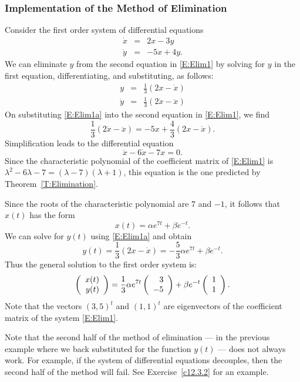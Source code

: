 \documentclass{ximera}
\begin{document}
\subsubsection*{Implementation of the Method of Elimination}

Consider the first order system of differential equations
\begin{equation}  \label{E:Elim1}
\begin{array}{rcl}
\dot{x} & = & 2x-3y\\
\dot{y} & = & -5x+4y. 
\end{array}
\end{equation}
We can eliminate $y$ from the second equation in \eqref{E:Elim1} by solving for 
$y$ in the first equation, differentiating, and substituting, as follows:
\begin{equation} \label{E:Elim1a}
\begin{array}{rcl}
y & = & \frac{1}{3}(2x-\dot{x})\\
\dot{y} & = & \frac{1}{3}(2\dot{x}-\ddot{x})
\end{array}
\end{equation}
On substituting \eqref{E:Elim1a} into the second equation in \eqref{E:Elim1}, we
find
\[
\frac{1}{3}(2\dot{x}-\ddot{x}) = -5x + \frac{4}{3}(2x-\dot{x}).
\]
Simplification leads to the differential equation
\[
\ddot{x} - 6\dot{x} - 7x = 0.
\]
Since the characteristic polynomial of the coefficient matrix of \eqref{E:Elim1}
is $\lambda^2-6\lambda-7=(\lambda-7)(\lambda+1)$, this equation is the one 
predicted by Theorem~\ref{T:Elimination}.

Since the roots of the characteristic polynomial are $7$ and $-1$, it follows 
that $x(t)$ has the form
\[
x(t)  =  \alpha e^{7t} + \beta e^{-t}.
\]
We can solve for $y(t)$ using \eqref{E:Elim1a} and obtain
\[
y(t) = \frac{1}{3}(2x-\dot{x}) = -\frac{5}{3} \alpha e^{7t} + \beta e^{-t}.
\]
Thus the general solution to the first order system is:
\[
\left(\begin{array}{r} x(t) \\ y(t)\end{array}\right) = \frac{1}{3}\alpha e^{7t}\left(\begin{array}{r} 3 \\ -5\end{array}\right) + 
\beta e^{-t}\left(\begin{array}{r} 1 \\ 1\end{array}\right).
\]
Note that the vectors $(3,5)^t$ and $(1,1)^t$ are eigenvectors of the coefficient matrix of the system \eqref{E:Elim1}.

Note that the second half of the method of elimination --- in the previous 
example where we back substituted for the function $y(t)$ --- does not always 
work.  For example, if the system of differential equations decouples, then 
the second half of the method will fail.   See Exercise~\ref{c12.3.2} for an 
example. 
\end{document}
